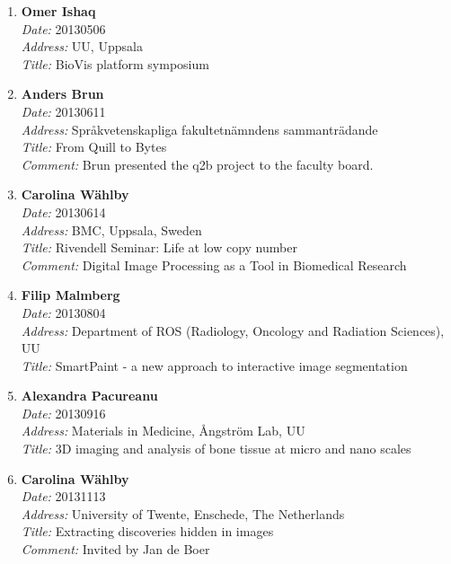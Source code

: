 \begin{enumerate}
%
\item 
{\bf Omer Ishaq}~\\
{\em Date:} 20130506~\\
{\em Address:} UU, Uppsala~\\
{\em Title:} BioVis platform symposium


\item 
{\bf Anders Brun}~\\
{\em Date:} 20130611~\\
{\em Address:} Spr\aa kvetenskapliga fakultetn\"{a}mndens sammantr\"{a}dande~\\
{\em Title:} From Quill to Bytes~\\
{\em Comment:} Brun presented the q2b project to the faculty board. %


\item 
{\bf Carolina W\"{a}hlby}~\\
{\em Date:} 20130614~\\
{\em Address:} BMC, Uppsala, Sweden~\\
{\em Title:} Rivendell Seminar: Life at low copy number~\\
{\em Comment:} Digital Image Processing as a Tool in Biomedical Research


\item 
{\bf Filip Malmberg}~\\
{\em Date:} 20130804~\\
{\em Address:} Department of ROS (Radiology, Oncology and Radiation Sciences), UU~\\
{\em Title:} SmartPaint - a new approach to interactive image segmentation


\item 
{\bf Alexandra Pacureanu}~\\
{\em Date:} 20130916~\\
{\em Address:} Materials in Medicine, \AA ngstr\"{o}m Lab, UU~\\
{\em Title:} 3D imaging and analysis of bone tissue at micro and nano scales

\item 
{\bf Carolina W\"{a}hlby}~\\
{\em Date:} 20131113~\\
{\em Address:} University of Twente, Enschede, The Netherlands~\\
{\em Title:} Extracting discoveries hidden in images~\\
{\em Comment:} Invited by Jan de Boer



\end{enumerate}
